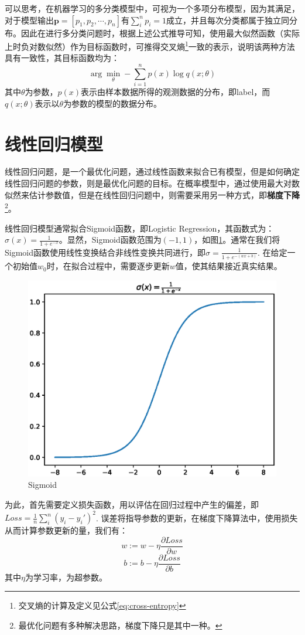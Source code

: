 \documentclass[12pt,a4paper]{article}
\begin{document}
  可以思考，在机器学习的多分类模型中，可视为一个多项分布模型，因为其满足，对于模型输出$\mathbf{p} = \left[ p_1,p_2,\cdots,p_n \right]$有$\sum\limits_i^{n} p_i = 1$成立，并且每次分类都属于独立同分布。因此在进行多分类问题时，根据上述公式推导可知，使用最大似然函数（实际上时负对数似然）作为目标函数时，可推得交叉熵\footnote{交叉熵的计算及定义见公式\eqref{eq:cross-entropy}}一致的表示，说明该两种方法具有一致性，其目标函数均为：
  $$
  \arg\min \limits _\theta -\sum_{i=1}^n p(x)\log q(x;\theta)
  $$
  其中$\theta$为参数，$p(x)$表示由样本数据所得的观测数据的分布，即label，而$q(x;\theta)$表示以$\theta$为参数的模型的数据分布。
  
  \section{线性回归模型}
  线性回归问题，是一个最优化问题，通过线性函数来拟合已有模型，但是如何确定线性回归问题的参数，则是最优化问题的目标。在概率模型中，通过使用最大对数似然来估计参数值，但是在线性回归问题中，则需要采用另一种方式，即\textbf{梯度下降}\footnote{最优化问题有多种解决思路，梯度下降只是其中一种。}。

  线性回归模型通常拟合Sigmoid函数，即Logistic Regression，其函数式为：$\sigma(x) = \frac{1}{1 + e^{-x}}$。显然，Sigmoid函数范围为$(-1, 1)$，如图\ref{fig:sigmoid}。通常在我们将Sigmoid函数使用线性变换结合非线性变换共同进行，即$\sigma = \frac{1}{1+e^{-(wx+b)}}$. 在给定一个初始值$w_0$时，在拟合过程中，需要逐步更新$w$值，使其结果接近真实结果。
  \begin{figure}[!htbp]
    \includegraphics[width=\textwidth, trim=15 20 15 20, clip]{sigmoid.eps}
    \caption{Sigmoid}
    \label{fig:sigmoid}
  \end{figure}
  为此，首先需要定义损失函数，用以评估在回归过程中产生的偏差，即$Loss=
  \frac{1}{n}\sum\limits_i^n (y_i-y_i')^2$. 误差将指导参数的更新，在梯度下降算法中，使用损失从而计算参数更新的量，我们有：$$w := w -\eta \frac{\partial Loss}{\partial w}$$ $$b := b - \eta \frac{\partial Loss}{\partial b}$$
  其中$\eta$为学习率，为超参数。
\end{document}
